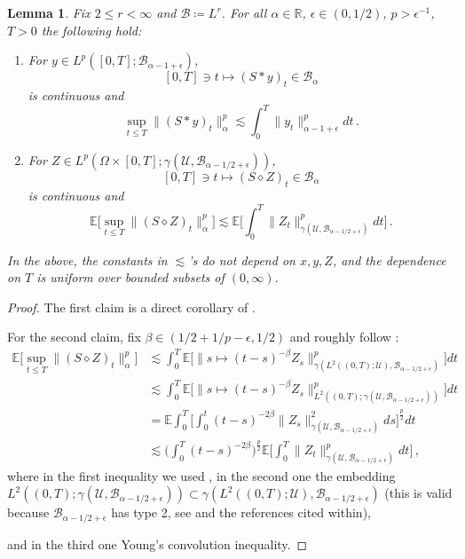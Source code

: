 \documentclass[final]{amsart}
\newtheorem{lem}[thm]{Lemma}
\numberwithin{thm}{section}
\numberwithin{equation}{section}
\newcommand{\E}{\mathbb{E}}
\newcommand{\U}{\mathcal{U}}
\newcommand{\R}{\mathbb{R}}
\newcommand{\B}{\mathcal{B}}
\begin{document}
\begin{lem}\label{convolution-sup-bounds}
    Fix $2 \leq r < \infty$ and $\B \coloneqq L^r$. For all $\alpha \in \R$, $\epsilon \in (0,1/2)$, $p > \epsilon^{-1}$, $T > 0$ the following hold:
    \begin{enumerate}[label=(\roman*)]
        \item For $y \in L^p([0,T]; \B_{\alpha - 1 + \epsilon})$,
        $$[0,T] \ni t \mapsto (S*y)_t \in \B_\alpha$$
        is continuous and
        $$
        \sup_{t \leq T} \|(S * y)_t\|^p_\alpha \lesssim \int_0^T \|y_t\|^p_{\alpha - 1 + \epsilon} dt \,.$$
        \item For $Z \in L^p(\Omega \times [0,T];\gamma(\U, \B_{\alpha - 1/2 + \epsilon}))$,
        $$[0,T] \ni t \mapsto (S\diamond Z)_t \in \B_\alpha$$
        is continuous and
        $$\E\Big[\sup_{t \leq T} \|(S \diamond Z)_t\|^p_\alpha \Big] \lesssim \E\Big[\int_0^T \|Z_t\|^p_{\gamma(\U,\B_{\alpha - 1/2 + \epsilon})} dt\Big] \,.$$
    \end{enumerate}
    In the above, the constants in $\lesssim$'s do not depend on $x,y,Z$, and the dependence on $T$ is uniform over bounded subsets of $(0,\infty)$.
\end{lem}
\begin{proof}
    The first claim is a direct corollary of \cite[Lemma 3.6]{umd-existence}. 

    For the second claim, fix $\beta \in ( 1/2 + 1/p - \epsilon,  1/2) $ and roughly follow \cite[Pages 1057-1058]{feller-stoch-reac-diff}:
    \begin{align*}
    \E\Big[\sup_{t \leq T} \|(S \diamond Z)_t\|^p_\alpha \Big] &\lesssim \int_0^T \E\Big[\|s \mapsto (t-s)^{-\beta}Z_s\|^p_{\gamma(L^2((0,T);\U),\B_{\alpha-1/2+\epsilon})}\Big]dt \\
    &\lesssim
    \int_0^T  \E\Big[\|s \mapsto (t-s)^{-\beta} Z_s\|^p_{L^2((0,T); \gamma(\U,\B_{\alpha-1/2+\epsilon}))}\Big]dt \\
    &= 
    \E \int_0^T  \Big[ \int_0^t (t-s)^{-2\beta}\| Z_s \|_{\gamma(\U,\B_{\alpha-1/2+\epsilon})}^2 ds \Big]^{\frac{p}{2}} dt
    \\
    &\lesssim \Big(\int_0^T (t-s)^{-2\beta}\Big)^{\frac{p}{2}}
    \E\Big[\int_0^T \|Z_t\|^p_{\gamma(\U,\B_{\alpha - 1/2 + \epsilon})} dt\Big] \,,
    \end{align*}
    where in the first inequality we used \cite[Proposition 4.2]{umd-existence}, in the second one the embedding $L^2((0,T); \gamma(\U,\B_{\alpha-1/2+\epsilon})) \subset \gamma(L^2((0,T);\U),\B_{\alpha-1/2+\epsilon})$ (this is valid because $\B_{\alpha-1/2+\epsilon}$ has type 2, see \cite[Page 24, the discussion before Corollary 3.10]{umd-integration} and the references cited within),
    
    and in the third one Young's  convolution inequality.
\end{proof}
\end{document}
